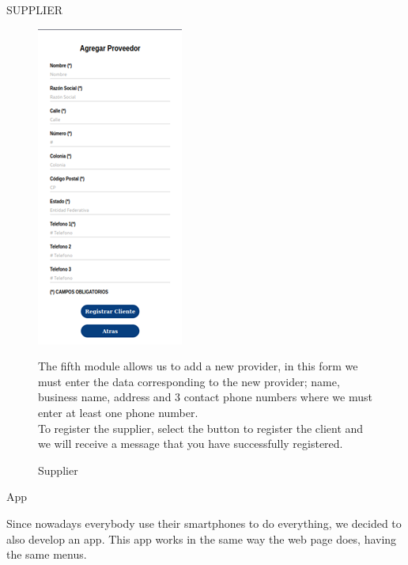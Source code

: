 \documentclass{article}
\begin{document}
\begin{center}
SUPPLIER
\end{center}
\begin{figure}[ht]
\begin{minipage}[t]{0.5\linewidth}
\caption {Supplier}
\centering
\includegraphics[scale=1]{fig9}
\end{minipage}
\begin{minipage}[t]{0.5\linewidth}
\bigskip
\bigskip
\bigskip
\bigskip
\bigskip
\bigskip
The fifth module allows us to add a new provider, in this form we must enter the data corresponding to the new provider; name, business name, address and 3 contact phone numbers where we must enter at least one phone number.\\

To register the supplier, select the button to register the client and we will receive a message that you have successfully registered.
\end{minipage}
\end{figure}

\pagebreak

\begin{center}
App
\end{center}
Since nowadays everybody use their smartphones to do everything, we decided to also develop an app. This app works in the same way the web page does, having the same menus.\\
\end{document}
